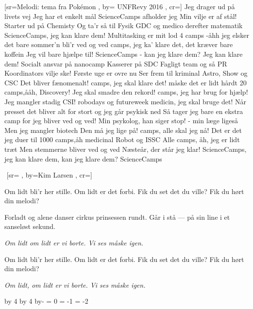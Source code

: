 \documentclass[pdftex,12pt]{article}
\begin{document}
\begin{songs}{}
[sr={Melodi: tema fra Pokémon}
,
by={ UNFRevy 2016}
,
cr={}]\hypertarget{ScienceCamps}{}
\label{song93}
\beginverse
		Jeg drager ud på livets vej
		Jeg har et enkelt mål
		ScienceCamps afholder jeg
		Min vilje er af stål!
\endverse
\beginverse
		Starter ud på Chemisty
		Og ta’r så til Fysik
		GDC og medico
		derefter matematik
\endverse
\beginverse
		ScienceCamps, jeg kan klare dem!
		Multitasking er mit lod
		4 camps -åhh jeg elsker det
		bare sommer’n bli’r ved og ved
\endverse
{} camps, jeg ka’ klare det,
		det kræver bare koffein
		Jeg vil bare hjælpe til!
		ScienceCamps - kan jeg klare dem?
		Jeg kan klare dem!
\endverse
\beginverse
		Socialt ansvar på nanocamp
		Kasserer på SDC
		Fagligt team og så PR
		Koordinators vilje ske!
\endverse
\beginverse
		Første uge er ovre nu
		Ser frem til kriminal
		Astro, Show og CSC
		Det bliver fænomenalt!
\endverse
{} camps, jeg skal klare det!
		måske det er lidt hårdt
		20 camps,ååh, Discovery!
		Jeg skal smadre den rekord!
\endverse
{} camps, jeg har brug for hjælp!
		Jeg mangler stadig CSI!
		robodays og futureweek
		medicin, jeg skal bruge det!
\endverse
\beginverse
		Når presset det bliver alt for stort
		og jeg går psykisk ned
		Så tager jeg bare en ekstra camp
		for jeg bliver ved og ved!
\endverse
\beginverse
		Min psykolog, han siger stop!
		- min læge ligeså
		Men jeg mangler biotech
		Den må jeg lige på!
\endverse
{} camps, alle skal jeg nå!
		Det er det jeg duer til
		1000 camps,åh medicinal
		Robot og ISSC
\endverse
\beginverse
		Alle camps, åh, jeg er lidt træt
		Men stemmerne bliver ved og ved
		Næsteår, der står jeg klar!
		ScienceCamps, jeg kan klare dem,
		kan jeg klare dem? ScienceCamps
\endverse
\endsong





﻿%
[sr={}
,
by={Kim Larsen}
,
cr={}]\hypertarget{Om lidt bli'r her stille}{}
\label{song94}

\beginverse
Om lidt bli’r her stille.
Om lidt er det forbi.
Fik du set det du ville?
Fik du hørt din melodi?
\endverse

\beginverse
Forladt og alene
danser cirkus prinsessen rundt.
Går i stå --- på sin line
i et sanseløst sekund.
\endverse

\beginverse
\emph{Om lidt om lidt
er vi borte.
Vi ses måske igen.}
\endverse

\beginverse
Om lidt bli’r her stille.
Om lidt er det forbi.
Fik du set det du ville?
Fik du hørt din melodi?
\endverse

\beginverse
\lrep\emph{Om lidt, om lidt
er vi borte.
Vi ses måske igen.}\rrep
\endverse
\endsong



\end{songs}\makeatletter
\newcount\divFour
\divFour \c@page
\divide\divFour by 4
\multiply\divFour by 4
\advance\divFour by-\c@page
\edef\remainFour{\the\divFour}
\ifnum\remainFour = 0
  \clearpage\null\clearpage\null\clearpage\null
\else\ifnum\remainFour = -1
  \clearpage\null\clearpage\null
\else\ifnum\remainFour = -2
  \clearpage\null
\fi\fi\fi
{}
\setlength{\headwidth}{\textwidth}
\end{document}
